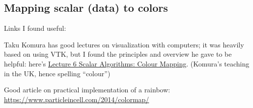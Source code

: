 \documentclass[10pt]{amsart}
\begin{document}
\begin{multicols*}{2}
\section{Mapping scalar (data) to colors}

Links I found useful:

Taku Komura has good lectures on visualization with computers; it was heavily based on using VTK, but I found the principles and overview he gave to be helpful: here's \href{http://www.inf.ed.ac.uk/teaching/courses/vis/lecture_notes/lecture6.pdf}{Lecture 6 Scalar Algorithms: Colour Mapping}.  (Komura's teaching in the UK, hence spelling ``colour'')

Good article on practical implementation of a rainbow: \url{https://www.particleincell.com/2014/colormap/}


\end{multicols*}
\end{document}
